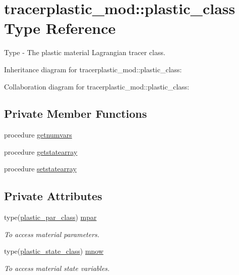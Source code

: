 \hypertarget{structtracerplastic__mod_1_1plastic__class}{}\section{tracerplastic\+\_\+mod\+:\+:plastic\+\_\+class Type Reference}
\label{structtracerplastic__mod_1_1plastic__class}


Type -\/ The plastic material Lagrangian tracer class.  




Inheritance diagram for tracerplastic\+\_\+mod\+:\+:plastic\+\_\+class\+:


Collaboration diagram for tracerplastic\+\_\+mod\+:\+:plastic\+\_\+class\+:
\subsection*{Private Member Functions}
\begin{DoxyCompactItemize}
\item 
procedure \mbox{\hyperlink{structtracerplastic__mod_1_1plastic__class_a86eb9828ca9f40789da553d1d40fae19}{getnumvars}}
\item 
procedure \mbox{\hyperlink{structtracerplastic__mod_1_1plastic__class_a633bfd965f7964ca5d8fd9fdb7c3e2d0}{getstatearray}}
\item 
procedure \mbox{\hyperlink{structtracerplastic__mod_1_1plastic__class_ae42b613c9b924bc54f278c1361ca59e3}{setstatearray}}
\end{DoxyCompactItemize}
\subsection*{Private Attributes}
\begin{DoxyCompactItemize}
\item 
type(\mbox{\hyperlink{structtracerplastic__mod_1_1plastic__par__class}{plastic\+\_\+par\+\_\+class}}) \mbox{\hyperlink{structtracerplastic__mod_1_1plastic__class_aa7e8b3a74a085714eac5917aaa2fc8c6}{mpar}}
\begin{DoxyCompactList}\small\item\em To access material parameters. \end{DoxyCompactList}\item 
type(\mbox{\hyperlink{structtracerplastic__mod_1_1plastic__state__class}{plastic\+\_\+state\+\_\+class}}) \mbox{\hyperlink{structtracerplastic__mod_1_1plastic__class_aa2e33df26e814fa1380e8184c54ee42e}{mnow}}
\begin{DoxyCompactList}\small\item\em To access material state variables. \end{DoxyCompactList}\end{DoxyCompactItemize}


